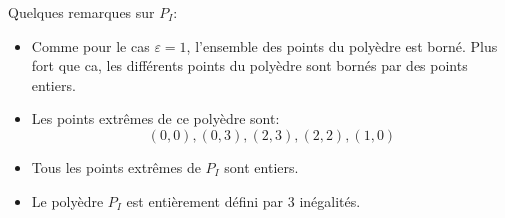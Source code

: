 {\begin{td-sol}[]
\begin{enumerate}
            

            Quelques remarques sur \(P_I\):
            \begin{itemize}
                \item Comme pour le cas \(\varepsilon = 1\), l'ensemble des points du polyèdre est borné.
                Plus fort que ca, les différents points du polyèdre sont bornés par des points entiers.
                \item Les points extrêmes de ce polyèdre sont:
                \begin{equation*}
                    (0, 0), (0, 3), (2, 3), (2, 2), (1, 0)
                \end{equation*}
                \item Tous les points extrêmes de \(P_I\) sont entiers.
                \item Le polyèdre \(P_I\) est entièrement défini par 3 inégalités.
            \end{itemize}
        \end{enumerate}
	\end{td-sol}
}{}